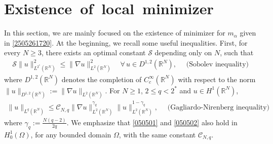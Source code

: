 \documentclass[10pt]{article}
\numberwithin{equation}{section}
\numberwithin{equation}{section}
\begin{document}
\section{Existence~of~local~minimizer}\label{S_2}
In this section, we are mainly focused on the existence of minimizer for $m_\alpha$ given in \eqref{2505261720}. At the beginning, we recall some useful inequalities. First, for every $N \geq 3$, there exists an optimal constant $\mathcal{S}$ depending only on $N$, such
that
\begin{equation}\label{050501}
\begin{aligned}
\mathcal{S}\|u\|^{2}_{L^{2^{*}}(\mathbb{R}^N)} \leq\|\nabla u\|^{2}_{L^{2}(\mathbb{R}^N)}\quad \forall\, u \in D^{1,2}(\mathbb{R}^{N}), \quad \text{ (Sobolev inequality) }
\end{aligned}
\end{equation}
where $D^{1,2}(\mathbb{R}^{N})$ denotes the completion of $C^{\infty}_{c}(\mathbb{R}^{N})$ with respect to the norm $\|u\|_{D^{1,2}(\mathbb{R}^{N})}:=\|\nabla u\|_{L^{2}(\mathbb{R}^{N})}$. For $N \geq 1$, $2\leq q< 2^{*}$ and $u \in H^{1}(\mathbb{R}^N)$,
\begin{equation}\label{050502}
\begin{aligned}
\|u\|_{L^q(\mathbb{R}^N)}\leq \mathcal{C}_{N,q}\|\nabla u\|^{\gamma_{q}}_{L^{2}(\mathbb{R}^{N})}
\|u\|^{1-\gamma_{q}}_{L^{2}(\mathbb{R}^{N})}, \quad \text{ (Gagliardo-Nirenberg inequality) }
\end{aligned}
\end{equation}
where $\gamma_{q}:=\frac{N(q-2)}{2q}$. We emphasize that \eqref{050501} and \eqref{050502} also hold
in $H^1_0(\Omega)$, for any bounded domain $\Omega$, with the same constant $\mathcal{C}_{N,q}$.
\end{document}
